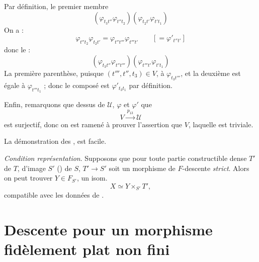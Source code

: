 \documentclass[11pt,a4paper]{article}
\begin{document}


Par définition, le premier
membre  \ill{}
\[
(\varphi_{t_3 t''} \varphi_{t'' t_2})(\varphi_{t_2 t'} \varphi_{t' t_1})
\]
On a :
\[
\varphi_{t'' t_2} \varphi_{t_2 t'} = \varphi_{t'' t'''} \varphi_{t''' t'}
\qquad [= \varphi'_{t'' t'}]
\]
donc le \struck{\ill{}} 
 \ill{} \ill{} :
\[
(\varphi_{t_3 t''} \varphi_{t'' t'''})(\varphi_{t''' t'} \varphi_{t' t_1})
\]
La première parenthèse, puisque $(t''', t'', t_3) \in V$,
  à $\varphi_{t_3 t'''}$, et la deuxième est
égale à $\varphi_{t''' t_1}$ ; donc le composé est
$\varphi'_{t_3 t_1}$ par définition.

Enfin, remarquons que  \struck{\ill{}}
dessus de $\mathcal{U}$, $\varphi$ et $\varphi'$
  \ill{} \ill{} que
\[
V \xrightarrow{\ p_{13}\ } \mathcal{U}
\]
est surjectif, \struck{\ill{}} donc on est
ramené à prouver l'assertion \ill{}
que \ill{} \ill{}  \ill{} $V$, laquelle est
triviale.

La démonstration des , est
facile.

\emph{Condition  représentation}. Supposons que pour
toute partie constructible dense $T'$ de $T$,
d'image $S'$ () de $S$, $T' \to S'$ soit
un morphisme de $F$-descente \emph{strict}.
Alors 
on peut trouver
$Y \in F_{S'}$,  un isom.
\[
X \simeq Y \times_{S'} T' ,
\]
compatible avec les données de
.

\section*{Descente pour un morphisme fidèlement plat non fini}
\end{document}
